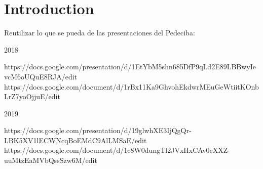 
\chapter{Introduction} %
\label{intro:intro} %



Reutilizar lo que se pueda de las presentaciones del Pedeciba:

2018

https://docs.google.com/presentation/d/1EtYbM5shn685DfP9qLd2E89LBBwyIevcM6oUQuE8RJA/edit
https://docs.google.com/document/d/1rBx11Ka9GhvohEkdwrMEuGeWtiitKOnbLrZ7yoOjjuE/edit

2019

https://docs.google.com/presentation/d/19glwhXE3IjQgQr-LBK5XV1lECWNcqBoEMdC9AlLMSaE/edit
https://docs.google.com/document/d/1c8W0dungTl2JVxHxCAv0cXXZ-uuMtzEaMVbQssSzw6M/edit
